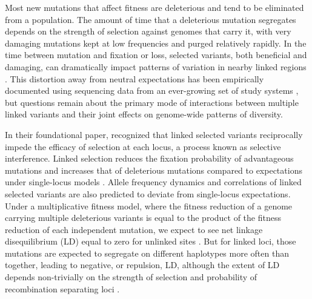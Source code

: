 \documentclass[]{article}
\begin{document}
Most new mutations that affect fitness are deleterious and tend to be
eliminated from a population. The amount of time that a deleterious mutation
segregates depends on the strength of selection against genomes that carry it,
with very damaging mutations kept at low frequencies and purged relatively
rapidly. In the time between mutation and fixation or loss, selected variants,
both beneficial and damaging, can dramatically impact patterns of variation in
nearby linked regions \citep[e.g.][]{Smith1974-em,Charlesworth1995-dq,Kim2000-on}.
This distortion away from neutral expectations has been empirically documented
using sequencing data from an ever-growing set of study systems
\citep{Novembre2009-kc,Cutter2013-mm,Comeron2014-oy}, but questions
remain about the primary mode of interactions between multiple linked variants
and their joint effects on genome-wide patterns of diversity.

In their foundational paper, \citet{Hill1966-gv} recognized that linked
selected variants reciprocally impede the efficacy of selection at each locus,
a process known as selective interference. Linked selection reduces the
fixation probability of advantageous mutations and increases that of
deleterious mutations compared to expectations under single-locus models
\citep{Birky1988-jm}. Allele frequency dynamics and correlations of linked
selected variants are also predicted to deviate from single-locus expectations.
Under a multiplicative fitness model, where the fitness reduction of a genome
carrying multiple deleterious variants is equal to the product of the fitness
reduction of each independent mutation, we expect to see net linkage
disequilibrium (LD) equal to zero for unlinked sites \citep{Kondrashov1995-va}.
But for linked loci, those mutations are expected to segregate on different
haplotypes more often than together, leading to negative, or repulsion, LD,
although the extent of LD depends non-trivially on the strength of selection
and probability of recombination separating loci
\citep{Hill1966-gv,McVean2000-ox}.
\end{document}
